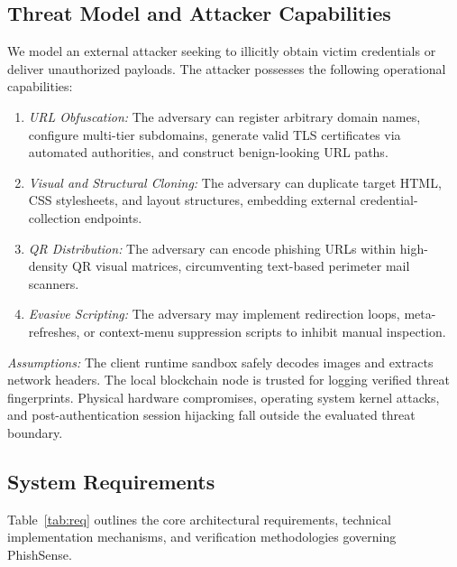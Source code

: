 \documentclass[conference]{IEEEtran}
\begin{document}
\subsection{Threat Model and Attacker Capabilities}
We model an external attacker seeking to illicitly obtain victim credentials or deliver unauthorized
payloads.
The attacker possesses the following operational capabilities:
\begin{enumerate}[leftmargin=*,nosep]
\item \textit{URL Obfuscation:} The adversary can register arbitrary domain names, configure multi-tier
      subdomains, generate valid TLS certificates via automated authorities, and construct benign-looking
      URL paths.
\item \textit{Visual and Structural Cloning:} The adversary can duplicate target HTML, CSS stylesheets,
      and layout structures, embedding external credential-collection endpoints.
\item \textit{QR Distribution:} The adversary can encode phishing URLs within high-density QR visual
      matrices, circumventing text-based perimeter mail scanners.
\item \textit{Evasive Scripting:} The adversary may implement redirection loops, meta-refreshes, or
      context-menu suppression scripts to inhibit manual inspection.
\end{enumerate}
\textit{Assumptions:} The client runtime sandbox safely decodes images and extracts network headers.
The local blockchain node is trusted for logging verified threat fingerprints.
Physical hardware compromises, operating system kernel attacks, and post-authentication session
hijacking fall outside the evaluated threat boundary.

\subsection{System Requirements}
Table~\ref{tab:req} outlines the core architectural requirements, technical implementation
mechanisms, and verification methodologies governing PhishSense.
\end{document}
